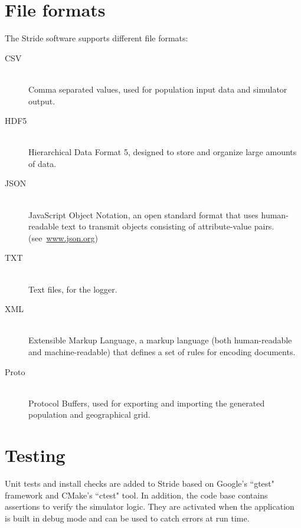 \section{File formats}
\label{section:FileFormats}

The Stride software supports different file formats: 
\begin{description}
	\item [CSV] \ \\
	Comma separated values, used for population input data and simulator output.
	\item [HDF5] \ \\
	Hierarchical Data Format 5, designed to store and organize large amounts of data.
	\item [JSON] \ \\
	JavaScript Object Notation, an open standard format that uses human-readable text to transmit objects consisting of attribute-value pairs. 	 \mbox{(see \url{www.json.org})}
	\item [TXT] \ \\
	Text files, for the logger. 
	\item [XML] \ \\
	Extensible Markup Language, a markup language (both human-readable and machine-readable) that defines a set of rules for encoding documents.
    \item [Proto] \ \\
    Protocol Buffers, used for exporting and importing the generated population and geographical grid.
\end{description}


%
\section{Testing}
Unit tests and install checks are added to Stride based on Google's ``gtest" framework and CMake's ``ctest" tool. 
In addition, the code base contains assertions to verify the simulator logic. 
They are activated when the application is built in debug mode and can be used to catch errors at run time. 


